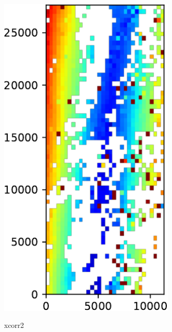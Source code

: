 \documentclass{beamer}
\begin{document}
\begin{frame}
\begin{columns}
\begin{column}{0.3\textwidth}
            \centering
            \includegraphics[width=0.8\textwidth]{figures/xcorr2-result}\\
            \begin{scriptsize} xcorr2 \end{scriptsize}
        \end{column}
        \begin{column}{0.39\textwidth}
            \centering

\end{column}
\end{columns}
\end{frame}
\end{document}
